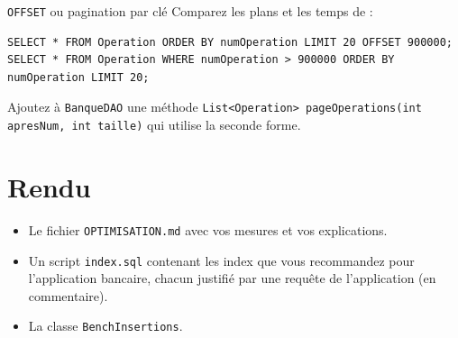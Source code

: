 \documentclass[11pt]{article}
\begin{document}
\begin{exobox}{\texttt{OFFSET} ou pagination par cl\'e}
Comparez les plans et les temps de :
\begin{lstlisting}
SELECT * FROM Operation ORDER BY numOperation LIMIT 20 OFFSET 900000;
SELECT * FROM Operation WHERE numOperation > 900000 ORDER BY numOperation LIMIT 20;
\end{lstlisting}
Ajoutez \`a \texttt{BanqueDAO} une m\'ethode \texttt{List<Operation> pageOperations(int apresNum, int taille)} qui utilise la seconde forme.
\end{exobox}

\section{Rendu}
\begin{itemize}
  \item Le fichier \texttt{OPTIMISATION.md} avec vos mesures et vos explications.
  \item Un script \texttt{index.sql} contenant les index que vous recommandez pour l'application bancaire, chacun justifi\'e par
        une requ\^ete de l'application (en commentaire).
  \item La classe \texttt{BenchInsertions}.
\end{itemize}
\end{document}

